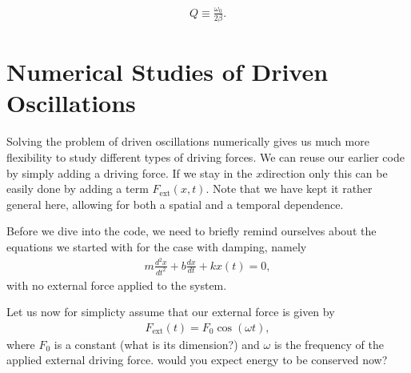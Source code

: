 \documentclass[letterpaper,10pt,english]{sphinxmanual}
\begin{document}
\begin{equation*}
\begin{split}
\begin{equation}
Q\equiv \frac{\omega_0}{2\beta}.
\label{_auto51} \tag{70}
\end{equation}
\end{split}
\end{equation*}

\section{Numerical Studies of Driven Oscillations}
\label{\detokenize{chapter1:numerical-studies-of-driven-oscillations}}
Solving the problem of driven oscillations numerically gives us much
more flexibility to study different types of driving forces. We can
reuse our earlier code by simply adding a driving force. If we stay in
the \(x\)\sphinxhyphen{}direction only this can be easily done by adding a term
\(F_{\mathrm{ext}}(x,t)\). Note that we have kept it rather general
here, allowing for both a spatial and a temporal dependence.

Before we dive into the code, we need to briefly remind ourselves
about the equations we started with for the case with damping, namely
\begin{equation*}
\begin{split}
m\frac{d^2x}{dt^2} + b\frac{dx}{dt}+kx(t) =0,
\end{split}
\end{equation*}
with no external force applied to the system.

Let us now for simplicty assume that our external force is given by
\begin{equation*}
\begin{split}
F_{\mathrm{ext}}(t) = F_0\cos{(\omega t)},
\end{split}
\end{equation*}
where \(F_0\) is a constant (what is its dimension?) and \(\omega\) is the frequency of the applied external driving force.
 would you expect energy to be conserved now?
\end{document}
